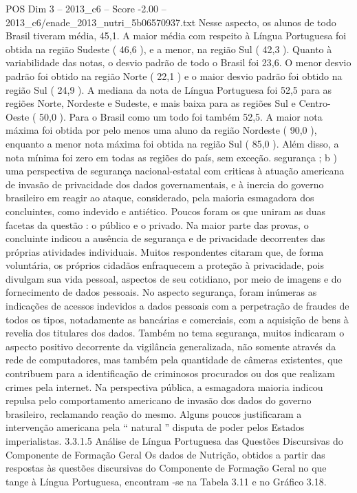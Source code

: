 \begin{textsample}{POS Dim 3 – 2013\_c6 – Score -2.00 – 2013\_c6/enade\_2013\_nutri\_5b06570937.txt}
Nesse aspecto, os alunos de todo Brasil tiveram média, 45,1.
A maior média com respeito à Língua Portuguesa foi obtida na região Sudeste ( 46,6 ), e a menor, na região Sul ( 42,3 ).
Quanto à variabilidade das notas, o desvio padrão de todo o Brasil foi 23,6.
O menor desvio padrão foi obtido na região Norte ( 22,1 ) e o maior desvio padrão foi obtido na região Sul ( 24,9 ).
A mediana da nota de Língua Portuguesa foi 52,5 para as regiões Norte, Nordeste e Sudeste, e mais baixa para as regiões Sul e Centro-Oeste ( 50,0 ).
Para o Brasil como um todo foi também 52,5.
A maior nota máxima foi obtida por pelo menos uma aluno da região Nordeste ( 90,0 ), enquanto a menor nota máxima foi obtida na região Sul ( 85,0 ).
Além disso, a nota mínima foi zero em todas as regiões do país, sem exceção. segurança ; b ) uma perspectiva de segurança nacional-estatal com criticas à atuação americana de invasão de privacidade dos dados governamentais, e à inercia do governo brasileiro em reagir ao ataque, considerado, pela maioria esmagadora dos concluintes, como indevido e antiético.
Poucos foram os que uniram as duas facetas da questão : o público e o privado.
Na maior parte das provas, o concluinte indicou a ausência de segurança e de privacidade decorrentes das próprias atividades individuais.
Muitos respondentes citaram que, de forma voluntária, os próprios cidadãos enfraquecem a proteção à privacidade, pois divulgam sua vida pessoal, aspectos de seu cotidiano, por meio de imagens e do fornecimento de dados pessoais.
No aspecto segurança, foram inúmeras as indicações de acessos indevidos a dados pessoais com a perpetração de fraudes de todos os tipos, notadamente as bancárias e comerciais, com a aquisição de bens à revelia dos titulares dos dados.
Também no tema segurança, muitos indicaram o aspecto positivo decorrente da vigilância generalizada, não somente através da rede de computadores, mas também pela quantidade de câmeras existentes, que contribuem para a identificação de criminosos procurados ou dos que realizam crimes pela internet.
Na perspectiva pública, a esmagadora maioria indicou repulsa pelo comportamento americano de invasão dos dados do governo brasileiro, reclamando reação do mesmo.
Alguns poucos justificaram a intervenção americana pela “ natural ” disputa de poder pelos Estados imperialistas. 3.3.1.5 Análise de Língua Portuguesa das Questões Discursivas do Componente de Formação Geral Os dados de Nutrição, obtidos a partir das respostas às questões discursivas do Componente de Formação Geral no que tange à Língua Portuguesa, encontram -se na Tabela 3.11 e no Gráfico 3.18.

\end{textsample}
